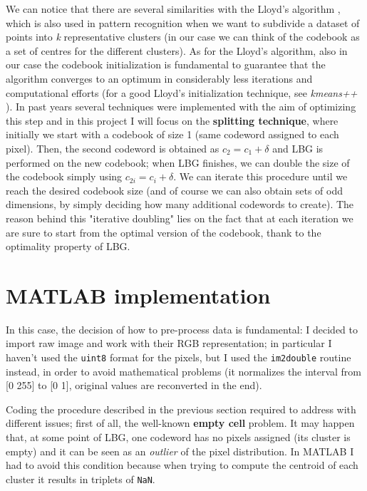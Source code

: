 \documentclass{report}
\def\code#1{\texttt{#1}}
\begin{document}
We can notice that there are several similarities with the Lloyd's algorithm \cite{Lloyd}, which is also used in pattern recognition when we want to subdivide a dataset of points into \textit{k} representative clusters (in our case we can think of the codebook as a set of centres for the different clusters). As for the Lloyd's algorithm, also in our case the codebook initialization is fundamental to guarantee that the algorithm converges to an optimum in considerably less iterations and computational efforts (for a good Lloyd's initialization technique, see \textit{kmeans++} \cite{kmeans++}). In past years several techniques were implemented with the aim of optimizing this step and in this project I will focus on the \textbf{splitting technique}, where initially we start with a codebook of size 1 (same codeword assigned to each pixel). Then, the second codeword is obtained as $ c_2 = c_1 + \delta$ and LBG is performed on the new codebook; when LBG finishes, we can double the size of the codebook simply using $c_{2i} = c_i + \delta$. We can iterate this procedure until we reach the desired codebook size (and of course we can also obtain sets of odd dimensions, by simply deciding how many additional codewords to create). The reason behind this "iterative doubling" lies on the fact that at each iteration we are sure to start from the optimal version of the codebook, thank to the optimality property of LBG.

\section{MATLAB implementation}

In this case, the decision of how to pre-process data is fundamental: I decided to import raw image and work with their RGB representation; in particular I haven't used the \code{uint8} format for the pixels, but I used the \code{im2double} routine instead, in order to avoid mathematical problems (it normalizes the interval from [0 255] to [0 1], original values are reconverted in the end).

Coding the procedure described in the previous section required to address with different issues; first of all, the well-known \textbf{empty cell} problem. It may happen that, at some point of LBG, one codeword has no pixels assigned (its cluster is empty) and it can be seen as an \textit{outlier} of the pixel distribution. In MATLAB I had to avoid this condition because when trying to compute the centroid of each cluster it results in triplets of \code{NaN}.
\end{document}
